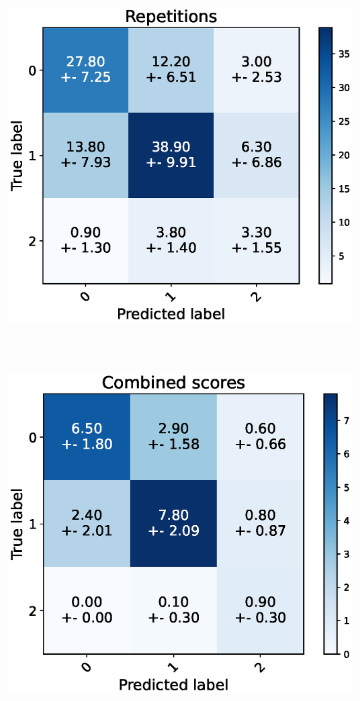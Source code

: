 \begin{figure}[h]
  \centering
  \begin{subfigure}[t]{0.48\textwidth}
      \includegraphics[width=\textwidth]{files/figs/res/pelvis/cnf-reps.eps}
      \caption{}
      \label{fig:pelvis-cnf-reps}
  \end{subfigure}
  ~
  \begin{subfigure}[t]{0.48\textwidth}
      \includegraphics[width=\textwidth]{files/figs/res/pelvis/cnf-combined.eps}
      \caption{}
      \label{fig:pelvis-cnf-comb}
  \end{subfigure}


\end{figure}
